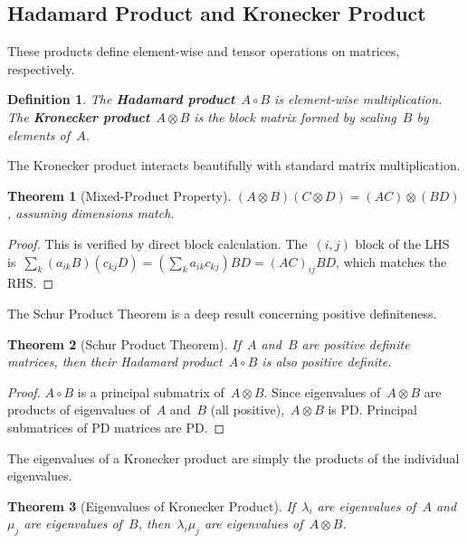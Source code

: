 \documentclass[12pt]{article}
\newtheorem{theorem}{Theorem}[section]
\newtheorem{definition}{Definition}[section]
\begin{document}
\subsection{Hadamard Product and Kronecker Product}

These products define element-wise and tensor operations on matrices, respectively.

\begin{definition}
    The \textbf{Hadamard product}~$A \circ B$ is element-wise multiplication. The \textbf{Kronecker product}~$A \otimes B$ is the block matrix formed by scaling~$B$ by elements of~$A$.
\end{definition}

The Kronecker product interacts beautifully with standard matrix multiplication.

\begin{theorem}[Mixed-Product Property]
    $(A \otimes B)(C \otimes D) = (AC) \otimes (BD)$, assuming dimensions match.
\end{theorem}

\begin{proof}
    This is verified by direct block calculation. The~$(i, j)$ block of the LHS is~$\sum_k (a_{ik} B) (c_{kj} D) = (\sum_k a_{ik} c_{kj}) BD = (AC)_{ij} BD$, which matches the RHS.
\end{proof}

The Schur Product Theorem is a deep result concerning positive definiteness.

\begin{theorem}[Schur Product Theorem]
    If~$A$ and~$B$ are positive definite matrices, then their Hadamard product~$A \circ B$ is also positive definite.
\end{theorem}

\begin{proof}
    $A \circ B$ is a principal submatrix of~$A \otimes B$. Since eigenvalues of~$A \otimes B$ are products of eigenvalues of~$A$ and~$B$ (all positive),~$A \otimes B$ is PD. Principal submatrices of PD matrices are PD.
\end{proof}

The eigenvalues of a Kronecker product are simply the products of the individual eigenvalues.

\begin{theorem}[Eigenvalues of Kronecker Product]
    If~$\lambda_i$ are eigenvalues of~$A$ and~$\mu_j$ are eigenvalues of~$B$, then~$\lambda_i \mu_j$ are eigenvalues of~$A \otimes B$.
\end{theorem}
\end{document}
